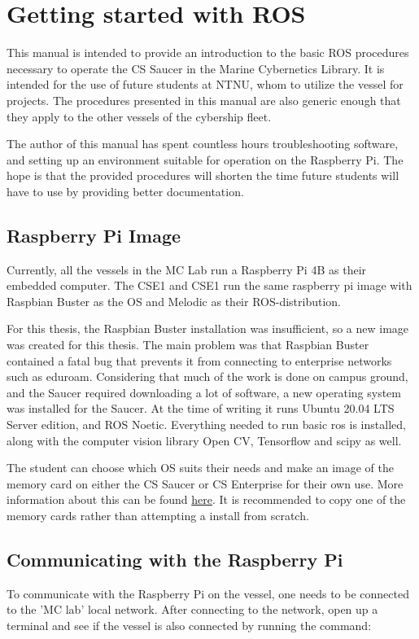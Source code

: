 \chapter{Getting started with ROS}

This manual is intended to provide an introduction to the basic ROS procedures necessary to operate the CS Saucer in the Marine Cybernetics Library. It is intended for the use of future students at NTNU, whom to utilize the vessel for projects. The procedures presented in this manual are also generic enough that they apply to the other vessels of the cybership fleet. 

The author of this manual has spent countless hours troubleshooting software, and setting up an environment suitable for operation on the Raspberry Pi. The hope is that the provided procedures will shorten the time future students will have to use by providing better documentation. 

\section{Raspberry Pi Image}

Currently, all the vessels in the MC Lab  run a Raspberry Pi 4B as their embedded computer. The CSE1 and CSE1 run the same raspberry pi image with Raspbian Buster as the OS and Melodic as their ROS-distribution. 

For this thesis, the Raspbian Buster installation was insufficient, so a new image was created for this thesis. The main problem was that Raspbian Buster contained a fatal bug that prevents it from connecting to enterprise networks such as eduroam. Considering that much of the work is done on campus ground, and the Saucer required downloading a lot of software, a new operating system was installed for the Saucer. At the time of writing it runs Ubuntu 20.04 LTS Server edition, and ROS Noetic. Everything needed to run basic ros is installed, along with the computer vision library Open CV, Tensorflow and scipy as well. 

The student can choose which OS suits their needs and make an image of the memory card on either the CS Saucer or CS Enterprise for their own use. More information about this can be found \href{https://www.raspberrypi.com/software/}{here}. It is recommended to copy one of the memory cards rather than attempting a install from scratch. 


\section{Communicating with the Raspberry Pi}
\label{sec:commwithpi}
To communicate with the Raspberry Pi on the vessel, one needs to be connected to the 'MC lab' local network. After connecting to the network, open up a terminal and see if the vessel is also connected by running the command: 

